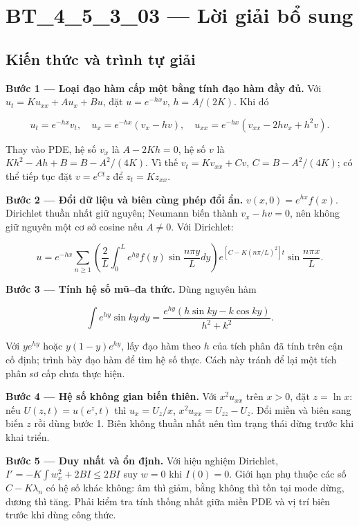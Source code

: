 \documentclass[10pt,a4paper]{article}
\begin{document}
\section*{BT\_4\_5\_3\_03 — Lời giải bổ sung}
\subsection*{Kiến thức và trình tự giải}
\textbf{Bước 1 — Loại đạo hàm cấp một bằng tính đạo hàm đầy đủ.} Với $u_t=Ku_{xx}+Au_x+Bu$, đặt $u=e^{-hx}v$, $h=A/(2K)$. Khi đó


\[
u_t=e^{-hx}v_t,\quad u_x=e^{-hx}(v_x-hv),\quad
u_{xx}=e^{-hx}(v_{xx}-2hv_x+h^2v).
\]


Thay vào PDE, hệ số $v_x$ là $A-2Kh=0$, hệ số $v$ là $Kh^2-Ah+B=B-A^2/(4K)$. Vì thế $v_t=Kv_{xx}+Cv$, $C=B-A^2/(4K)$; có thể tiếp tục đặt $v=e^{Ct}z$ để $z_t=Kz_{xx}$.

\textbf{Bước 2 — Đổi dữ liệu và biên cùng phép đổi ẩn.} $v(x,0)=e^{hx}f(x)$. Dirichlet thuần nhất giữ nguyên; Neumann biến thành $v_x-hv=0$, nên không giữ nguyên một cơ sở cosine nếu $A\ne0$. Với Dirichlet:


\[
u=e^{-hx}\sum_{n\ge1}\left(\frac2L\int_0^Le^{hy}f(y)\sin\frac{n\pi y}Ldy\right)
e^{[C-K(n\pi/L)^2]t}\sin\frac{n\pi x}L.
\]


\textbf{Bước 3 — Tính hệ số mũ–đa thức.} Dùng nguyên hàm


\[
\int e^{hy}\sin ky\,dy
=\frac{e^{hy}(h\sin ky-k\cos ky)}{h^2+k^2}.
\]


Với $y e^{hy}$ hoặc $y(1-y)e^{hy}$, lấy đạo hàm theo $h$ của tích phân đã tính trên cận cố định; trình bày đạo hàm để tìm hệ số thực. Cách này tránh để lại một tích phân sơ cấp chưa thực hiện.

\textbf{Bước 4 — Hệ số không gian biến thiên.} Với $x^2u_{xx}$ trên $x>0$, đặt $z=\ln x$: nếu $U(z,t)=u(e^z,t)$ thì $u_x=U_z/x$, $x^2u_{xx}=U_{zz}-U_z$. Đổi miền và biên sang biến $z$ rồi dùng bước 1. Biên không thuần nhất nên tìm trạng thái dừng trước khi khai triển.

\textbf{Bước 5 — Duy nhất và ổn định.} Với hiệu nghiệm Dirichlet, $I'=-K\int w_x^2+2BI\le2BI$ suy $w=0$ khi $I(0)=0$. Giới hạn phụ thuộc các số $C-K\lambda_n$ có hệ số khác không: âm thì giảm, bằng không thì tồn tại mode dừng, dương thì tăng. Phải kiểm tra tính thống nhất giữa miền PDE và vị trí biên trước khi dùng công thức.
\end{document}
